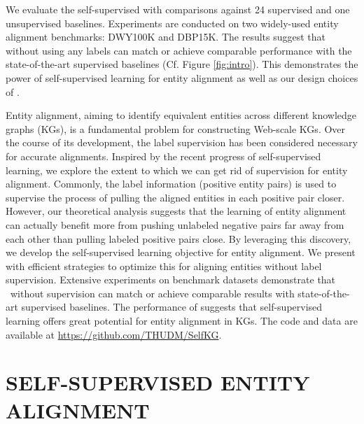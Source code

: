 {We evaluate the self-supervised \solution  with comparisons against 24 supervised and one unsupervised baselines. 
Experiments are conducted on two widely-used entity alignment benchmarks: DWY100K and DBP15K. 
The results suggest that \solution without using any labels can match or achieve comparable performance with the state-of-the-art supervised baselines (Cf.  Figure \ref{fig:intro}). 
This demonstrates the power of self-supervised learning for entity alignment as well as our design choices of \solution. 





}%
Entity alignment, aiming to identify equivalent entities across different knowledge graphs (KGs), is a fundamental problem for constructing Web-scale KGs. 
Over the course of its development, the label supervision has been considered necessary for accurate alignments. 
Inspired by the recent progress of self-supervised learning, we explore the extent to which we can get rid of supervision for entity alignment. 
Commonly, the label information (positive entity pairs) is used to supervise the process of pulling the aligned entities in each positive pair closer.
However, our theoretical analysis suggests that the learning of entity alignment can actually benefit more from 
pushing unlabeled negative pairs far away from each other than pulling labeled positive pairs close. 
By leveraging this discovery, we develop the self-supervised learning objective for entity alignment.
We present \solution with efficient strategies to optimize this  for aligning entities without label supervision. 
Extensive experiments on benchmark datasets demonstrate that \solution~without supervision can 
match or achieve comparable results with state-of-the-art supervised baselines. 
The performance of \solution suggests that self-supervised learning offers great potential for entity alignment in KGs. 
{The code and data are available at \url{https://github.com/THUDM/SelfKG}}.

\section{{SELF-SUPERVISED ENTITY ALIGNMENT}} \label{sec:model}


